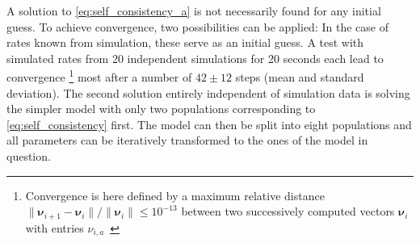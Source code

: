 A solution to \autoref{eq:self_consistency_a} is not necessarily found for any initial guess. 
To achieve convergence, two possibilities 
can be applied: In the case of rates known from simulation, these serve as an initial guess. 
A test with simulated rates from 20 independent simulations for 20 seconds each lead to convergence%
\footnote{
    Convergence is here defined by a maximum relative distance 
    $\|\boldsymbol\nu_{i + 1} - \boldsymbol\nu_i\| / \|\boldsymbol\nu_i\| \le 10^{-13}$ between two 
    successively computed vectors $\boldsymbol\nu_i$ with entries $\nu_{i, a}$~\cite{scipy}
}  
most after a number of $42 \pm 12$ steps (mean and standard deviation). 
The second solution entirely independent of simulation data is solving the simpler model 
with only two populations corresponding to \autoref{eq:self_consistency} first.
The model can then be split 
into eight populations and all parameters can be iteratively transformed to the ones of the 
model in question. 

\FloatBarrier
